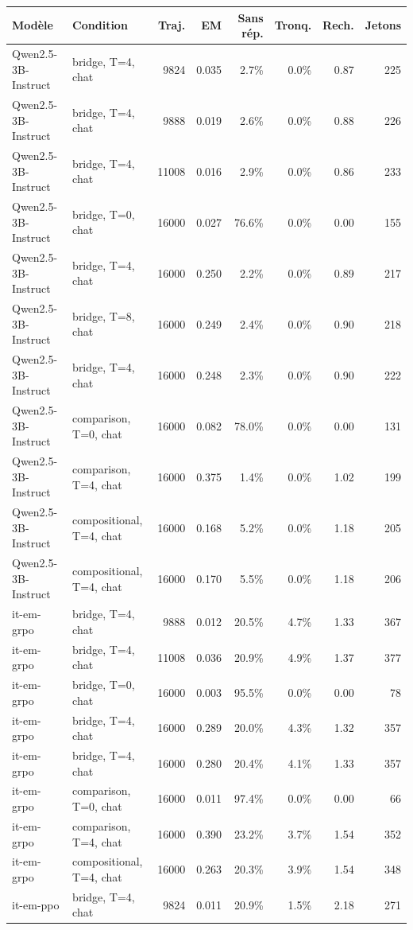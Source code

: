 \begin{tabular}{llrrrrrr}
\toprule
Modèle & Condition & Traj. & EM & Sans rép. & Tronq. & Rech. & Jetons \\
\midrule
Qwen2.5-3B-Instruct & bridge, T=4, chat & 9824 & 0.035 & 2.7\% & 0.0\% & 0.87 & 225 \\
Qwen2.5-3B-Instruct & bridge, T=4, chat & 9888 & 0.019 & 2.6\% & 0.0\% & 0.88 & 226 \\
Qwen2.5-3B-Instruct & bridge, T=4, chat & 11008 & 0.016 & 2.9\% & 0.0\% & 0.86 & 233 \\
Qwen2.5-3B-Instruct & bridge, T=0, chat & 16000 & 0.027 & 76.6\% & 0.0\% & 0.00 & 155 \\
Qwen2.5-3B-Instruct & bridge, T=4, chat & 16000 & 0.250 & 2.2\% & 0.0\% & 0.89 & 217 \\
Qwen2.5-3B-Instruct & bridge, T=8, chat & 16000 & 0.249 & 2.4\% & 0.0\% & 0.90 & 218 \\
Qwen2.5-3B-Instruct & bridge, T=4, chat & 16000 & 0.248 & 2.3\% & 0.0\% & 0.90 & 222 \\
Qwen2.5-3B-Instruct & comparison, T=0, chat & 16000 & 0.082 & 78.0\% & 0.0\% & 0.00 & 131 \\
Qwen2.5-3B-Instruct & comparison, T=4, chat & 16000 & 0.375 & 1.4\% & 0.0\% & 1.02 & 199 \\
Qwen2.5-3B-Instruct & compositional, T=4, chat & 16000 & 0.168 & 5.2\% & 0.0\% & 1.18 & 205 \\
Qwen2.5-3B-Instruct & compositional, T=4, chat & 16000 & 0.170 & 5.5\% & 0.0\% & 1.18 & 206 \\
it-em-grpo & bridge, T=4, chat & 9888 & 0.012 & 20.5\% & 4.7\% & 1.33 & 367 \\
it-em-grpo & bridge, T=4, chat & 11008 & 0.036 & 20.9\% & 4.9\% & 1.37 & 377 \\
it-em-grpo & bridge, T=0, chat & 16000 & 0.003 & 95.5\% & 0.0\% & 0.00 & 78 \\
it-em-grpo & bridge, T=4, chat & 16000 & 0.289 & 20.0\% & 4.3\% & 1.32 & 357 \\
it-em-grpo & bridge, T=4, chat & 16000 & 0.280 & 20.4\% & 4.1\% & 1.33 & 357 \\
it-em-grpo & comparison, T=0, chat & 16000 & 0.011 & 97.4\% & 0.0\% & 0.00 & 66 \\
it-em-grpo & comparison, T=4, chat & 16000 & 0.390 & 23.2\% & 3.7\% & 1.54 & 352 \\
it-em-grpo & compositional, T=4, chat & 16000 & 0.263 & 20.3\% & 3.9\% & 1.54 & 348 \\
it-em-ppo & bridge, T=4, chat & 9824 & 0.011 & 20.9\% & 1.5\% & 2.18 & 271 \\

\end{tabular}
